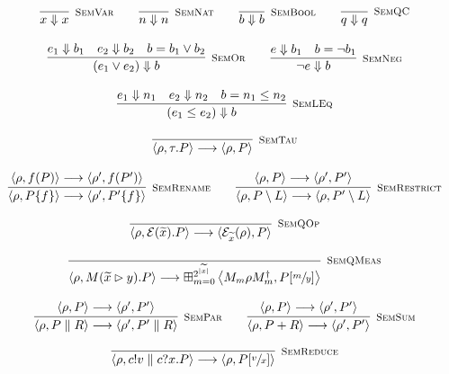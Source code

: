   \begin{gather*}
    \infer[\mbox{\footnotesize\scshape SemVar}]{x \Downarrow x}{} \qquad
    \infer[\mbox{\footnotesize\scshape SemNat}]{n \Downarrow n}{} \qquad
    \infer[\mbox{\footnotesize\scshape SemBool}]{b \Downarrow b}{}  \qquad
    \infer[\mbox{\footnotesize\scshape SemQC}]{q \Downarrow q}{} \\[0.3cm]
    \infer[\mbox{\footnotesize\scshape SemOr}]{(e_1 \lor e_2) \Downarrow b}{e_1 \Downarrow b_1 & e_2 \Downarrow b_2 & b = b_1 \lor b_2} \qquad
    \infer[\mbox{\footnotesize\scshape SemNeg}]{\neg e \Downarrow b}{e \Downarrow b_1 & b = \neg b_1} \\[0.3cm]
    \infer[\mbox{\footnotesize\scshape SemLEq}]{(e_1 \leq e_2) \Downarrow b}{e_1 \Downarrow n_1 & e_2 \Downarrow n_2 & b = n_1 \leq n_2} \\[0.3cm]
    \infer[\mbox{\footnotesize\scshape SemTau}]{\langle \rho, \tau . P \rangle \longrightarrow \langle \rho, P \rangle}{} \\[0.3cm]
    \infer[\mbox{\footnotesize\scshape SemRename}]{\langle \rho, P \{f\} \rangle \longrightarrow \langle \rho', P' \{f\}\rangle}{\langle \rho, f(P) \rangle \longrightarrow \langle \rho', f(P') \rangle} \qquad
    \infer[\mbox{\footnotesize\scshape SemRestrict}]{\langle \rho, P \setminus L \rangle \longrightarrow \langle \rho, P' \setminus L \rangle}{\langle \rho, P \rangle \longrightarrow \langle \rho', P' \rangle} \\[0.3cm]
    \infer[\mbox{\footnotesize\scshape SemQOp}]{\langle \rho, \mathcal{E}(\widetilde{x}) . P \rangle \longrightarrow \langle \mathcal{E}_{\widetilde{x}}(\rho), P \rangle}{} \\[0.3cm]
    \infer[\mbox{\footnotesize\scshape SemQMeas}]{\langle \rho, M(\widetilde{x} \rhd y) . P \rangle \longrightarrow \boxplus_{m = 0}^{2^{|\widetilde{x}|}} \left\langle {M_m \rho M_m^\dag}, P[\sfrac{m}{y}] \right\rangle}{} \\[0.3cm]
    \infer[\mbox{\footnotesize\scshape SemPar}]{\langle \rho, P \parallel R \rangle \longrightarrow \langle \rho', P' \parallel R \rangle}{\langle \rho, P \rangle \longrightarrow \langle \rho', P' \rangle} \qquad
    \infer[\mbox{\footnotesize\scshape SemSum}]{\langle \rho, P + R \rangle \longrightarrow \langle \rho', P' \rangle}{\langle \rho, P \rangle \longrightarrow \langle \rho', P' \rangle} \\[0.3cm]
    \infer[\mbox{\footnotesize\scshape SemReduce}]{\langle \rho, c!v \parallel c?x . P \rangle \longrightarrow \langle \rho, P[\sfrac{v}{x}] \rangle}{} \\[0.3cm]
  \end{gather*}
  
